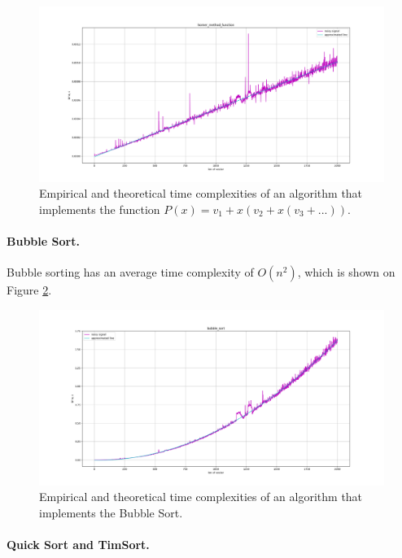 \begin{figure}[H]
    \center
    \includegraphics[width=\textwidth]{img/horner_method_function.png}
    \caption{Empirical and theoretical time complexities of an algorithm that implements the function $P(x) = v_1 + x(v_2 + x(v_3 + ...))$.}
    \label{ris:horner_method_function}
\end{figure}

\paragraph{Bubble Sort.}

Bubble sorting has an average time complexity of $O(n^2)$, which is shown on Figure \ref{ris:bubble_sort}.

\begin{figure}[H]
    \center
    \includegraphics[width=\textwidth]{img/bubble_sort.png}
    \caption{Empirical and theoretical time complexities of an algorithm that implements the Bubble Sort.}
    \label{ris:bubble_sort}
\end{figure}

\paragraph{Quick Sort and TimSort.}

